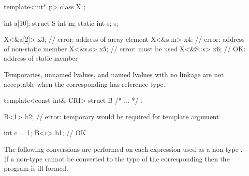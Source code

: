\begin{codeblock}
template<int* p> class X { };

int a[10];
struct S { int m; static int s; } s;

X<&a[2]> x3;                    // error: address of array element
X<&s.m> x4;                     // error: address of non-static member
X<&s.s> x5;                     // error:  must be used
X<&S::s> x6;                    // OK: address of static member
\end{codeblock}
\exitexample
\exitnote

\pnum
\enternote
Temporaries, unnamed lvalues, and named lvalues
with no linkage
are not acceptable
when the corresponding
has reference type.
\enterexample

\begin{codeblock}
template<const int& CRI> struct B { /* ... */ };

B<1> b2;                        // error: temporary would be required for template argument

int c = 1;
B<c> b1;                        // OK
\end{codeblock}
\exitexample
\exitnote

\pnum
The following conversions are performed on each expression used as a non-type
.
If a non-type
cannot be converted to the type of the corresponding
then the program is ill-formed.

